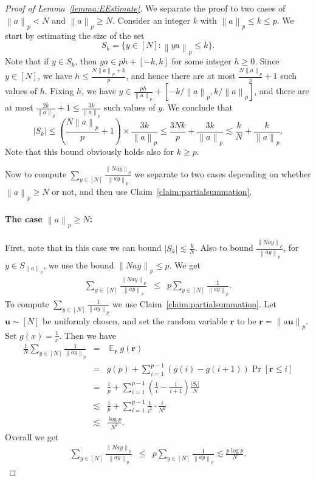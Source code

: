 \documentclass{toc}
\DeclareMathOperator{\Ex}{{\mathbb E}}
\newcommand{\Bu}{\mathbf{u}}   %
\newcommand{\Br}{\mathbf{r}}   %
\newcommand{\norm}[1]{\left\| #1 \right\|_p}
\begin{document}
\begin{proof}[Proof of Lemma~\ref{lemma:EEstimate}]
We separate the proof to two cases of $\norm{a} < N$ and $\norm{a} \geq N$.
Consider an integer $k$ with   $\norm{a} \le k \le p$. We start by  estimating the size of the set
$$S_k=\{y \in [N] : \norm{ya} \le k\}.$$
Note that if $y \in S_k$, then $y a  \in p h + [-k,k]$ for some integer $h \ge 0$. Since $y \in [N]$,  we have
$h \le \frac{N\norm{a}+k}{p}$,
and hence there are at most $\frac{N\norm{a}}{p}+1$ such values of $h$. Fixing $h$, we have $y \in \frac{ph}{\norm{a}} + [-k/\norm{a}, k/\norm{a}]$, and there are at most $\frac{2k}{\norm{a}}+1 \le \frac{3k}{\norm{a}}$ such values of $y$. We conclude that
\begin{equation*}
|S_k| \le  \left(\frac{N\norm{a}}{p}+1\right) \times \frac{3k}{\norm{a}}  \le \frac{3Nk}{p} +  \frac{3k}{\norm{a}}\lesssim \frac{k}{N} + \frac{k}{\norm{a}}.
\end{equation*}
Note that this bound obviously  holds  also for $k \ge p$.




%
%
%
%
%
%
%
%
%
%
%
%
%
%
%
%
%

Now to compute $\sum_{y \in [N]} \frac{\norm{Nay}}{\norm{ay}}$ we separate to two cases depending on whether $\norm{a}\geq N$ or not, and then use Claim~\ref{claim:partialsummation}.

\paragraph{The case $ \norm{a} \ge N$:}

First, note that in this case we can bound  $|S_k| \lesssim \frac{k}{N}$. Also to bound $\frac{\norm{Nay}}{\norm{ay}}$,
	 for $y\in S_{\norm{a}}$, we use the bound $\norm{Nay}\leq p$.
 We get
\begin{eqnarray*}
	\sum_{y \in [N]} \frac{\norm{Nay}}{\norm{ay}}
	&\leq&   p\sum_{y \in [N]} \frac{1}{\norm{ay}}.
	\end{eqnarray*}
	To compute $\sum_{y \in [N]} \frac{1}{\norm{ay}}$ we use Claim~\ref{claim:partialsummation}. Let $\Bu \sim [N]$ be uniformly chosen, and set the random variable $\Br$ to be $\Br = \norm{a\Bu}$. Set $g(x) = \frac{1}{x}$. Then we have
	\begin{eqnarray*}
\frac{1}{N}	\sum_{y \in [N]} \frac{1}{\norm{ay}}
        &=& \Ex_{\Br} g(\Br) \\
		&=& g(p)+ \sum_{i=1}^{p-1} \left(g(i)-g(i+1)\right) \Pr[\Br \leq i]\\
		&=& \frac{1}{p} + \sum_{i=1}^{p-1} \left(\frac{1}{i}-\frac{1}{i+1}\right) \frac{|S_i|}{N}\\
		&\lesssim& \frac{1}{p} + \sum_{i=1}^{p-1} \frac{1}{i^2} \cdot \frac{i}{N^2}\\
		&\lesssim&\frac{\log p}{N^2}.
  \end{eqnarray*}
Overall we get
\begin{eqnarray*}
	\sum_{y \in [N]} \frac{\norm{Nay}}{\norm{ay}}
	&\leq& p\sum_{y \in [N]} \frac{1}{\norm{ay}}\lesssim \frac{p\log p}{N} .
	\end{eqnarray*}

\end{proof}
\end{document}
